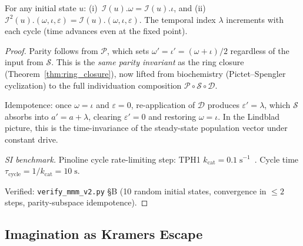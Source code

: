 \begin{theorem}
\label{thm:ind_parity}
For any initial state $u$:
(i)~$\mathcal{I}(u).\omega = \mathcal{I}(u).\iota$, and
(ii)~$\mathcal{I}^2(u).(\omega,\iota,\varepsilon) = \mathcal{I}(u).(\omega,\iota,\varepsilon)$.
The temporal index $\lambda$ increments with each cycle (time advances even at the fixed point).

\begin{proof}
Parity follows from $\mathcal{P}$, which sets $\omega' = \iota' = (\omega+\iota)/2$
regardless of the input from $\mathcal{S}$. This is the \emph{same parity invariant}
as the ring closure (Theorem~\ref{thm:ring_closure}), now lifted from
biochemistry (Pictet--Spengler cyclization) to the full individuation composition
$\mathcal{P} \circ \mathcal{S} \circ \mathcal{D}$.

Idempotence: once $\omega = \iota$ and $\varepsilon = 0$,
re-application of $\mathcal{D}$ produces $\varepsilon' = \lambda$,
which $\mathcal{S}$ absorbs into $a' = a + \lambda$, clearing
$\varepsilon' = 0$ and restoring $\omega = \iota$.
In the Lindblad picture, this is the time-invariance of the
steady-state population vector under constant drive.

\emph{SI benchmark.}
Pinoline cycle rate-limiting step: TPH1 $k_\mathrm{cat} = 0.1\;\mathrm{s^{-1}}$~\cite{mckinney05}.
Cycle time $\tau_\mathrm{cycle} = 1/k_\mathrm{cat} = 10\;\mathrm{s}$.

Verified: \texttt{verify\_mmm\_v2.py} \S B (10 random initial states,
convergence in $\leq 2$ steps, parity-subspace idempotence).
\qedhere
\end{proof}
\end{theorem}

\subsection{Imagination as Kramers Escape}


